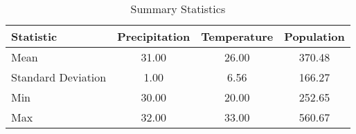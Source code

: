 
\begin{table}[H]
\centering
\caption{Summary Statistics}
\label{tab:summary_statistics}
\begin{tabularx}{\textwidth}{Xccc}
\toprule \toprule
Statistic & Precipitation & Temperature & Population \\
\midrule
Mean & 31.00 & 26.00 & 370.48 \\
Standard Deviation & 1.00 & 6.56 & 166.27 \\
Min & 30.00 & 20.00 & 252.65 \\
Max & 32.00 & 33.00 & 560.67 \\
\bottomrule
\end{tabularx}
\end{table}
